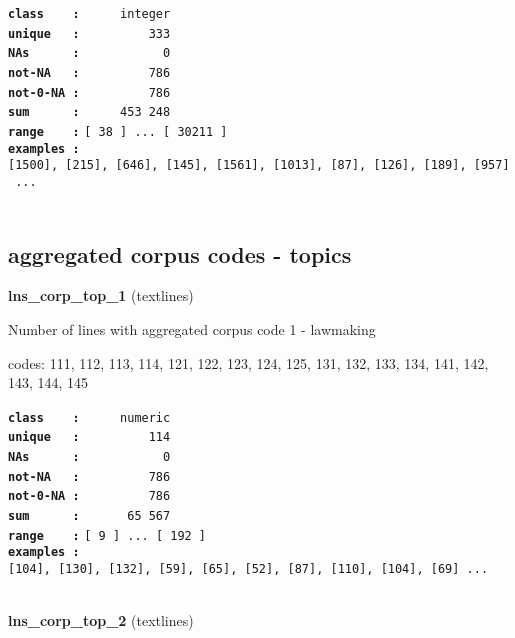 \documentclass[]{article}
\begin{document}
\textbf{\texttt{class\ \ \ \ :}} \texttt{~~~~~integer}\\
\textbf{\texttt{unique\ \ \ :}} \texttt{~~~~~~~~~333}\\
\textbf{\texttt{NAs\ \ \ \ \ \ :}} \texttt{~~~~~~~~~~~0}\\
\textbf{\texttt{not-NA\ \ \ :}} \texttt{~~~~~~~~~786}\\
\textbf{\texttt{not-0-NA\ :}} \texttt{~~~~~~~~~786}\\
\textbf{\texttt{sum\ \ \ \ \ \ :}} \texttt{~~~~~453~248}\\
\textbf{\texttt{range\ \ \ \ :}}
\texttt{{[}\ 38\ {]}\ ...\ {[}\ 30211\ {]}}\\
\textbf{\texttt{examples\ :}}
\texttt{{[}1500{]},\ {[}215{]},\ {[}646{]},\ {[}145{]},\ {[}1561{]},\ {[}1013{]},\ {[}87{]},\ {[}126{]},\ {[}189{]},\ {[}957{]}\ ...}\\

~

\subsection{aggregated corpus codes -
topics}\label{aggregated-corpus-codes---topics}

\textbf{lns\_corp\_top\_1} (textlines)

Number of lines with aggregated corpus code 1 - lawmaking

codes: 111, 112, 113, 114, 121, 122, 123, 124, 125, 131, 132, 133, 134,
141, 142, 143, 144, 145

\textbf{\texttt{class\ \ \ \ :}} \texttt{~~~~~numeric}\\
\textbf{\texttt{unique\ \ \ :}} \texttt{~~~~~~~~~114}\\
\textbf{\texttt{NAs\ \ \ \ \ \ :}} \texttt{~~~~~~~~~~~0}\\
\textbf{\texttt{not-NA\ \ \ :}} \texttt{~~~~~~~~~786}\\
\textbf{\texttt{not-0-NA\ :}} \texttt{~~~~~~~~~786}\\
\textbf{\texttt{sum\ \ \ \ \ \ :}} \texttt{~~~~~~65~567}\\
\textbf{\texttt{range\ \ \ \ :}}
\texttt{{[}\ 9\ {]}\ ...\ {[}\ 192\ {]}}\\
\textbf{\texttt{examples\ :}}
\texttt{{[}104{]},\ {[}130{]},\ {[}132{]},\ {[}59{]},\ {[}65{]},\ {[}52{]},\ {[}87{]},\ {[}110{]},\ {[}104{]},\ {[}69{]}\ ...}\\

~

\textbf{lns\_corp\_top\_2} (textlines)
\end{document}
